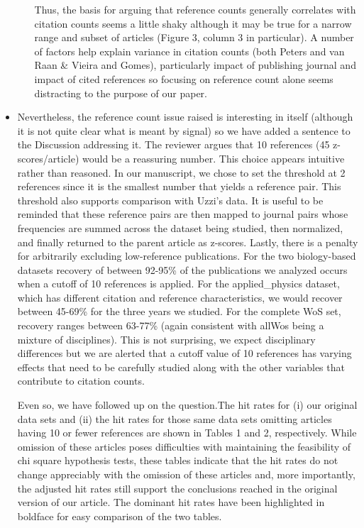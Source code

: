 \documentclass[11pt, oneside]{article}   	%
\begin{document}
\begin{itemize}
\begin{enumerate}
Thus, the basis for arguing that reference counts generally correlates with citation counts seems a little shaky although it may be true for a narrow range and subset of articles (Figure 3, column 3 in particular). A number of factors help explain variance in citation counts (both Peters and van Raan \& Vieira and Gomes), particularly impact of publishing journal and impact of cited references so focusing on reference count alone seems distracting to the purpose of our paper. 
\end{enumerate}
\item Nevertheless, the reference count issue raised is interesting in itself (although it is not quite clear what is meant by signal) so we have added a sentence to the Discussion addressing it. The reviewer argues that 10 references (45 z-scores/article) would be a reassuring number. This choice appears intuitive rather than reasoned. In our manuscript, we chose to set the threshold at 2 references since it is the smallest number that yields a reference pair. This threshold also supports comparison with Uzzi's data. It is useful to be reminded that these reference pairs are then mapped to journal pairs whose frequencies are summed across the dataset being studied, then normalized, and finally returned to the parent article as z-scores. Lastly, there is a penalty for arbitrarily excluding low-reference publications. For the two biology-based datasets recovery of between 92-95\% of the publications we analyzed occurs when a cutoff of 10 references is applied. For the applied\_physics dataset, which has different citation and reference characteristics, we would recover between 45-69\% for the three years we studied. For the complete WoS set, recovery ranges between 63-77\% (again consistent with allWos being a mixture of disciplines). This is not surprising, we expect disciplinary differences but we are alerted that a cutoff value of 10 references has varying effects that need to be carefully studied along with the other variables that contribute to citation counts.

\vspace{3mm} Even so, we have followed up on the question.The hit rates for (i) our original data sets and (ii) the hit rates for those same data sets omitting articles having 10 or fewer references are shown in Tables 1 and 2, respectively.  While omission of these articles poses difficulties with maintaining the feasibility of chi square hypothesis tests, these tables indicate that the hit rates do not change appreciably with the omission of these articles and, more importantly, the adjusted hit rates still support the conclusions reached in the original version of our article.  The dominant hit rates have been highlighted in boldface for easy comparison of the two tables.
\end{itemize}
\end{document}
